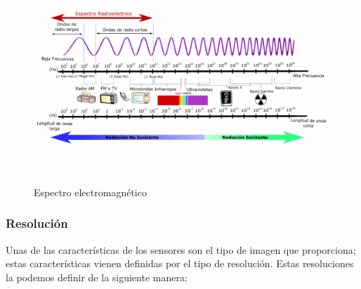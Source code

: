 \begin{figure}[H] \centering
  \includegraphics[height=8cm,keepaspectratio=true,clip=true]{imagenes/MarcoTeorico/espectro-electro.png}
  \caption{Espectro electromagnético}\label{Fig:espectro-electromagnetico}
\end{figure}


\subsubsection{Resolución}
Unas de las características de los sensores son el tipo de imagen que proporciona; estas características vienen definidas por el tipo de resolución. Estas resoluciones la podemos definir de la siguiente manera:

